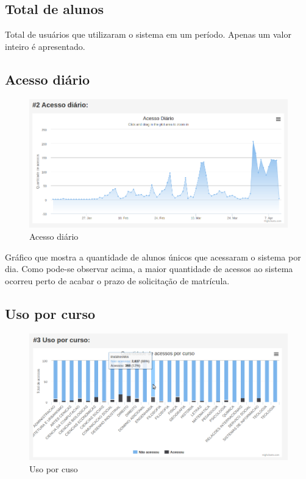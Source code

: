 \documentclass[graduacao,brazil]{ThesisPUC}
\begin{document}
\subsection{Total de alunos}


Total de usuários que utilizaram o sistema em um período. Apenas um valor inteiro é apresentado.

\subsection{Acesso diário}

\begin{figure}[H]
    \centering
    \includegraphics[width=\linewidth]{img/v3_estatistica2.png}
    \caption{Acesso diário}
\end{figure}

Gráfico que mostra a quantidade de alunos únicos que acessaram o sistema por dia. Como pode-se observar acima, a maior quantidade de acessos ao sistema ocorreu perto de acabar o prazo de solicitação de matrícula.

\subsection{Uso por curso}

\begin{figure}[H]
    \centering
    \includegraphics[width=\linewidth]{img/v3_estatistica3.png}
    \caption{Uso por cuso}
\end{figure}
\end{document}
